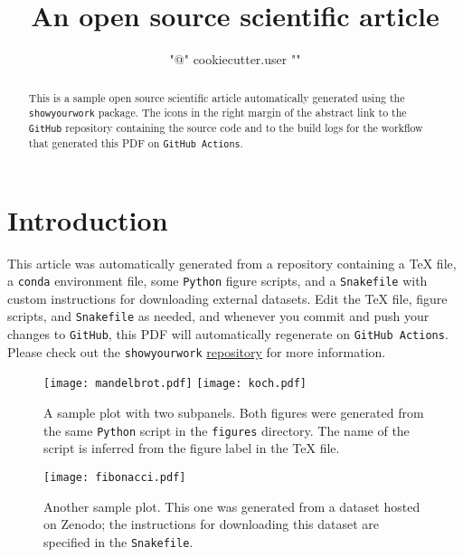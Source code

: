 \documentclass[twocolumn]{aastex631}
\begin{document}
\title{An open source scientific article}

\author{{ "{@" }}{{ cookiecutter.user }}{{ "}" }}

\begin{abstract}
    This is a sample open source scientific article automatically generated using the \texttt{showyourwork} package. 
    The icons in the right margin of the abstract link to the \texttt{GitHub} repository containing the source code and to the build logs for the workflow that generated this PDF on \texttt{GitHub Actions}.
\end{abstract}

\section{Introduction}
This article was automatically generated from a repository containing a TeX file,
a \texttt{conda} environment file, some \texttt{Python} figure scripts, and a \texttt{Snakefile} with custom instructions for downloading external datasets.
Edit the TeX file, figure scripts, and \texttt{Snakefile} as needed, and whenever you commit and push your changes to \texttt{GitHub}, this PDF will automatically regenerate on \texttt{GitHub Actions}. Please check out the \texttt{showyourwork} \href{https://github.com/rodluger/showyourwork}{repository} for more information.

\begin{figure}[ht!]
    \begin{centering}
        \texttt{[image: mandelbrot.pdf]}
        \texttt{[image: koch.pdf]}
        \caption{
            A sample plot with two subpanels. 
            Both figures were generated from the same \texttt{Python} script in the \texttt{figures} directory. 
            The name of the script is inferred from the figure label in the TeX file.
        }
        \label{fig:fractals}
    \end{centering}
\end{figure}

\begin{figure}[ht!]
    \begin{centering}
        \texttt{[image: fibonacci.pdf]}
        \caption{
            Another sample plot. 
            This one was generated from a dataset hosted on Zenodo; the instructions for downloading this dataset are specified in the \texttt{Snakefile}.
        }
        \label{fig:fibonacci}
    \end{centering}
\end{figure}
\end{document}
